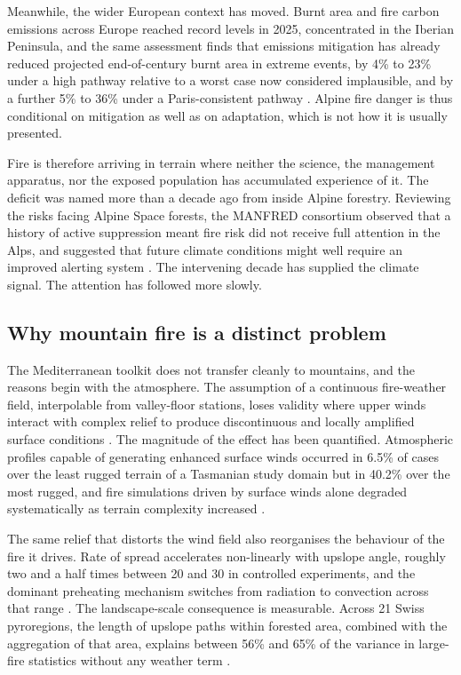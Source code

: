\documentclass[11pt,a4paper]{article}
\begin{document}
Meanwhile, the wider European context has moved. Burnt area and fire carbon emissions across Europe reached record levels in 2025, concentrated in the Iberian Peninsula, and the same assessment finds that emissions mitigation has already reduced projected end-of-century burnt area in extreme events, by 4\% to 23\% under a high pathway relative to a worst case now considered implausible, and by a further 5\% to 36\% under a Paris-consistent pathway \citep{burton_state_2026}. Alpine fire danger is thus conditional on mitigation as well as on adaptation, which is not how it is usually presented.

Fire is therefore arriving in terrain where neither the science, the management apparatus, nor the exposed population has accumulated experience of it. The deficit was named more than a decade ago from inside Alpine forestry. Reviewing the risks facing Alpine Space forests, the MANFRED consortium observed that a history of active suppression meant fire risk did not receive full attention in the Alps, and suggested that future climate conditions might well require an improved alerting system \citep{jandl_management_2013}. The intervening decade has supplied the climate signal. The attention has followed more slowly.

\subsection{Why mountain fire is a distinct problem}

The Mediterranean toolkit does not transfer cleanly to mountains, and the reasons begin with the atmosphere. The assumption of a continuous fire-weather field, interpolable from valley-floor stations, loses validity where upper winds interact with complex relief to produce discontinuous and locally amplified surface conditions \citep{sharples_overview_2009}. The magnitude of the effect has been quantified. Atmospheric profiles capable of generating enhanced surface winds occurred in 6.5\% of cases over the least rugged terrain of a Tasmanian study domain but in 40.2\% over the most rugged, and fire simulations driven by surface winds alone degraded systematically as terrain complexity increased \citep{ozaki_impact_2022}.

The same relief that distorts the wind field also reorganises the behaviour of the fire it drives. Rate of spread accelerates non-linearly with upslope angle, roughly two and a half times between 20\degree{} and 30\degree{} in controlled experiments, and the dominant preheating mechanism switches from radiation to convection across that range \citep{hayajneh_wind_2026}. The landscape-scale consequence is measurable. Across 21 Swiss pyroregions, the length of upslope paths within forested area, combined with the aggregation of that area, explains between 56\% and 65\% of the variance in large-fire statistics without any weather term \citep{conedera_linking_2024}.
\end{document}
